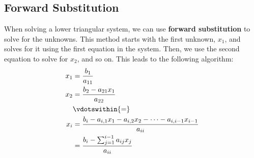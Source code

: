 \documentclass{article}
\begin{document}
\subsection{Forward Substitution}
When solving a lower triangular system, we can use \textbf{forward
substitution} to solve for the unknowns. This method starts with the
first unknown, \(x_1\), and solves for it using the first equation in
the system. Then, we use the second equation to solve for \(x_2\), and
so on. This leads to the following algorithm:
\begin{align*}
    x_1 & = \frac{b_1}{a_{11}}                                                                 \\
    x_2 & = \frac{b_2 - a_{21} x_1}{a_{22}}                                                    \\
        & \vdotswithin{=}                                                                      \\
    x_i & = \frac{b_i - a_{i, 1} x_1 - a_{i, 2} x_2 - \cdots - a_{i, i - 1} x_{i - 1}}{a_{ii}} \\
        & = \frac{b_i - \sum_{j = 1}^{i - 1} a_{ij} x_j}{a_{ii}}                               \\
\end{align*}
\end{document}
